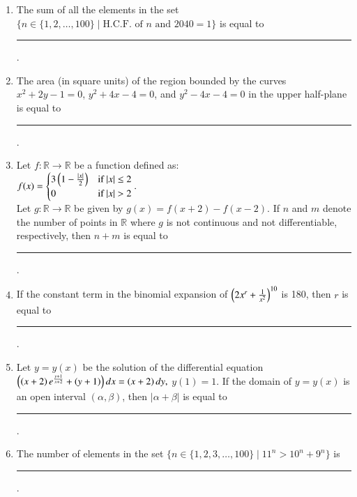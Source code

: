 \documentclass[journal,12pt,onecolumn]{IEEEtran}
\theoremstyle{remark}
\begin{document}
\begin{enumerate}
    \item The sum of all the elements in the set $ \{n \in \{1, 2, \ldots, 100\} \mid \text{H.C.F. of } n \text{ and } 2040 = 1 \} $ is equal to \rule{2.5cm}{0.4pt}.

    \item The area (in square units) of the region bounded by the curves $ x^2 + 2y - 1 = 0 $, $ y^2 + 4x - 4 = 0 $, and $ y^2 - 4x - 4 = 0 $ in the upper half-plane is equal to \rule{2.5cm}{0.4pt}.

    \item Let $ f : \mathbb{R} \to \mathbb{R} $ be a function defined as:\\
    $
    f(x) =
    \begin{cases}
    3\left(1-\frac{|x|}{2}\right) & \text{if } |x| \leq 2 \\
    0 & \text{if } |x| > 2
    \end{cases}.
    $\\
    Let $ g : \mathbb{R} \to \mathbb{R} $ be given by $ g(x) = f(x+2) - f(x-2) $. If $ n $ and $ m $ denote the number of points in $ \mathbb{R} $ where $ g $ is not continuous and not differentiable, respectively, then $ n + m $ is equal to \rule{2.5cm}{0.4pt}.

    \item If the constant term in the binomial expansion of $ \left(2x^{r} + \frac{1}{x^2}\right)^{10} $ is 180, then $ r $ is equal to \rule{2.5cm}{0.4pt}.

    \item Let $ y = y(x) $ be the solution of the differential equation
    $
    \left(\left(x+2\right)e^{\frac{y+1}{x+2}}+\left(y+1\right)\right) dx = \left(x+2\right) dy,
    $
    $ y(1) = 1 $. If the domain of $ y = y(x) $ is an open interval $ (\alpha, \beta) $, then $ |\alpha + \beta| $ is equal to \rule{2.5cm}{0.4pt}.
    \item The number of elements in the set $ \{n \in \{1, 2, 3, \ldots, 100\} \mid 11^n > 10^n + 9^n \} $ is \rule{2.5cm}{0.4pt}.
\end{enumerate}
\end{document}
